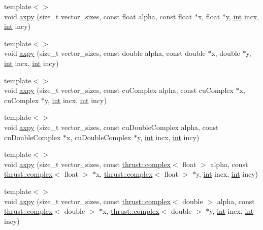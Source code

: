\begin{DoxyCompactItemize}
\item 
{\footnotesize template$<$$>$ }\\void \hyperlink{classcublas__wrap_a2cd3125ea77b7dd263e0c867229eed4f}{axpy} (size\-\_\-t vector\-\_\-sizes, const float alpha, const float $\ast$x, float $\ast$y, \hyperlink{classint}{int} incx, \hyperlink{classint}{int} incy)
\item 
{\footnotesize template$<$$>$ }\\void \hyperlink{classcublas__wrap_aa7c79d303f1ffe432291a7720b25365d}{axpy} (size\-\_\-t vector\-\_\-sizes, const double alpha, const double $\ast$x, double $\ast$y, \hyperlink{classint}{int} incx, \hyperlink{classint}{int} incy)
\item 
{\footnotesize template$<$$>$ }\\void \hyperlink{classcublas__wrap_aa589dd7eb85d96b0335216e6f0df2a8a}{axpy} (size\-\_\-t vector\-\_\-sizes, const cu\-Complex alpha, const cu\-Complex $\ast$x, cu\-Complex $\ast$y, \hyperlink{classint}{int} incx, \hyperlink{classint}{int} incy)
\item 
{\footnotesize template$<$$>$ }\\void \hyperlink{classcublas__wrap_a0d429b72eb11bf367daa0cbfdb5739f2}{axpy} (size\-\_\-t vector\-\_\-sizes, const cu\-Double\-Complex alpha, const cu\-Double\-Complex $\ast$x, cu\-Double\-Complex $\ast$y, \hyperlink{classint}{int} incx, \hyperlink{classint}{int} incy)
\item 
{\footnotesize template$<$$>$ }\\void \hyperlink{classcublas__wrap_ab92546ff42ea8853f94fe51c5147278b}{axpy} (size\-\_\-t vector\-\_\-sizes, const \hyperlink{test__deflation__typedefs_8h_a25cabcac5deb559feab415e2c445d8ba}{thrust\-::complex}$<$ float $>$ alpha, const \hyperlink{test__deflation__typedefs_8h_a25cabcac5deb559feab415e2c445d8ba}{thrust\-::complex}$<$ float $>$ $\ast$x, \hyperlink{test__deflation__typedefs_8h_a25cabcac5deb559feab415e2c445d8ba}{thrust\-::complex}$<$ float $>$ $\ast$y, \hyperlink{classint}{int} incx, \hyperlink{classint}{int} incy)
\item 
{\footnotesize template$<$$>$ }\\void \hyperlink{classcublas__wrap_aae25c40b9da485ee7a905f569e23cbc9}{axpy} (size\-\_\-t vector\-\_\-sizes, const \hyperlink{test__deflation__typedefs_8h_a25cabcac5deb559feab415e2c445d8ba}{thrust\-::complex}$<$ double $>$ alpha, const \hyperlink{test__deflation__typedefs_8h_a25cabcac5deb559feab415e2c445d8ba}{thrust\-::complex}$<$ double $>$ $\ast$x, \hyperlink{test__deflation__typedefs_8h_a25cabcac5deb559feab415e2c445d8ba}{thrust\-::complex}$<$ double $>$ $\ast$y, \hyperlink{classint}{int} incx, \hyperlink{classint}{int} incy)

\end{DoxyCompactItemize}

